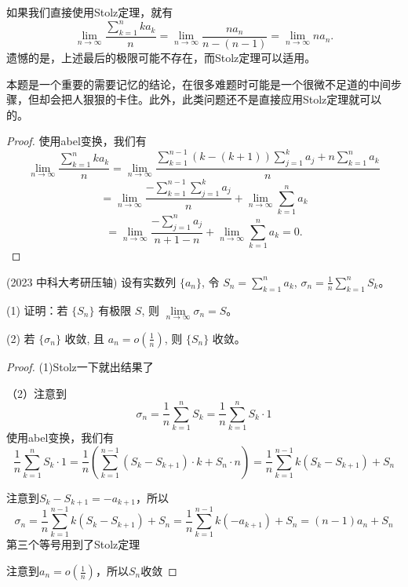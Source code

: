\documentclass[lang=cn,10pt,thmcnt=section]{elegantbook}
\begin{document}
\begin{remark}

	如果我们直接使用Stolz定理，就有
\[
\lim_{n \to \infty} \frac{\sum_{k=1}^n k a_k}{n} = \lim_{n \to \infty} \frac{n a_n}{n - (n-1)} = \lim_{n \to \infty} n a_n.
\]
遗憾的是，上述最后的极限可能不存在，而Stolz定理可以适用。

\end{remark}

\begin{remark}
	本题是一个重要的需要记忆的结论，在很多难题时可能是一个很微不足道的中间步骤，但却会把人狠狠的卡住。此外，此类问题还不是直接应用Stolz定理就可以的。
\end{remark}
\begin{proof}
	使用abel变换，我们有
\[
\lim_{n \to \infty} \frac{\sum_{k=1}^n k a_k}{n} = \lim_{n \to \infty} \frac{\sum_{k=1}^{n-1} (k - (k+1)) \sum_{j=1}^k a_j + n \sum_{k=1}^n a_k}{n}
\]
\[
= \lim_{n \to \infty} \frac{-\sum_{k=1}^{n-1} \sum_{j=1}^k a_j}{n} + \lim_{n \to \infty} \sum_{k=1}^n a_k
\]
\[
= \lim_{n \to \infty} \frac{-\sum_{j=1}^n a_j}{n+1-n} + \lim_{n \to \infty} \sum_{k=1}^n a_k = 0.
\]
\end{proof}
\begin{example}
	(2023 中科大考研压轴) 设有实数列 $\{a_n\}$, 令 $S_n = \sum\limits_{k=1}^n a_k$, $\sigma_n = \frac{1}{n}\sum\limits_{k=1}^n S_k$。

(1) 证明：若 $\{S_n\}$ 有极限 $S$, 则 $\lim\limits_{n \to \infty} \sigma_n = S$。

(2) 若 $\{\sigma_n\}$ 收敛, 且 $a_n = o\left(\frac{1}{n}\right)$, 则 $\{S_n\}$ 收敛。

\end{example}
\begin{proof}
	(1)Stolz一下就出结果了

	（2）注意到$$\sigma_n = \frac{1}{n}\sum\limits_{k=1}^n S_k=\frac{1}{n}\sum\limits_{k=1}^n S_k\cdot 1$$
	使用abel变换，我们有
	$$
	\frac{1}{n}\sum\limits_{k=1}^n S_k\cdot 1=\frac{1}{n}(\sum\limits_{k=1}^{n-1} (S_k-S_{k+1})\cdot k+S_n\cdot n)=\frac{1}{n}\sum\limits_{k=1}^{n-1} k(S_k-S_{k+1})+S_n
	$$

	注意到$S_k-S_{k+1}=-a_{k+1}$，所以
	$$
	\sigma_n=\frac{1}{n}\sum\limits_{k=1}^{n-1} k(S_k-S_{k+1})+S_n=\frac{1}{n}\sum\limits_{k=1}^{n-1} k(-a_{k+1})+S_n=(n-1)a_n+S_n
	$$第三个等号用到了Stolz定理

	注意到$a_n=o(\frac{1}{n})$，所以$S_n$收敛
\end{proof}
\end{document}
